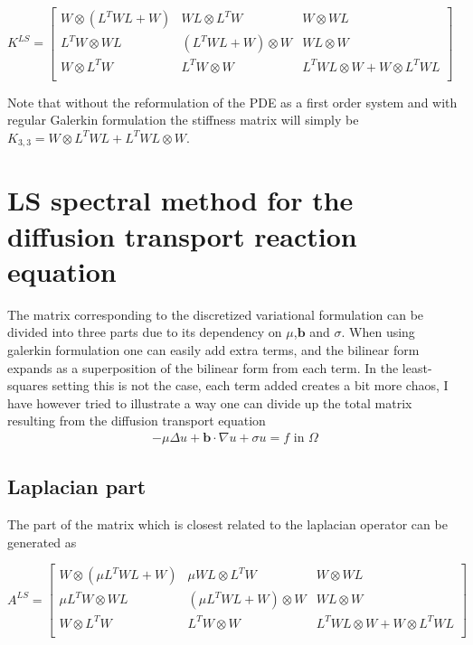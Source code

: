 %
$
K^{LS} = 
\begin{bmatrix}
	W \otimes (L^TWL+W) & WL \otimes L^TW 		 &	W \otimes WL  \\ 	
	L^TW \otimes WL     & (L^TWL+W) \otimes W  &	WL \otimes W  \\ 	
	W \otimes L^TW		  & L^TW \otimes W       &  L^TWL \otimes W +	W\otimes L^TWL  \\ 	
\end{bmatrix}
$

Note that without the reformulation of the PDE as a first order system and with regular Galerkin formulation the stiffness matrix will simply be 
$K_{3,3} = W \otimes L^TWL+ L^TWL \otimes W$.
\section{LS spectral method for the diffusion transport reaction equation}
The matrix corresponding to the discretized variational formulation can be divided into three parts due to its dependency on $\mu$,$\mathbf{b}$ and $\sigma$. When using galerkin formulation one can easily add extra terms, and the bilinear form expands as a superposition of the bilinear form from each term. In the least-squares setting this is not the case, each term added creates a bit more chaos, I have however tried to illustrate a way one can divide up the total matrix resulting from the diffusion transport equation
\begin{align}
	-\mu \Delta u + \mathbf{b} \cdot \nabla u +\sigma u = f \text{ in } \Omega
	\label{eq:ReactionImplementation}
\end{align}
\subsection{Laplacian part}
The part of the matrix which is closest related to the laplacian operator can be generated as 

$
A^{LS} = 
\begin{bmatrix}
	W \otimes (\mu L^TWL+W) & \mu WL \otimes L^TW 		 &	W \otimes WL  \\ 	
	\mu L^TW \otimes WL     & (\mu L^TWL+W) \otimes W  &	WL \otimes W  \\ 	
	W \otimes L^TW		  & L^TW \otimes W       &  L^TWL \otimes W +	W\otimes L^TWL  \\ 	
\end{bmatrix}
$

